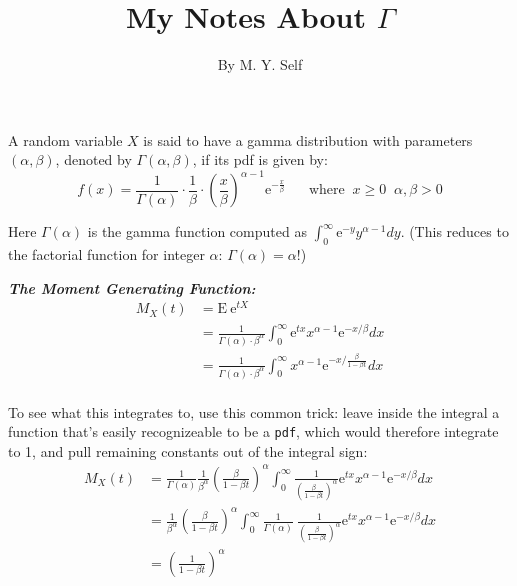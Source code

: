 \documentclass[12pt]{article}
\begin{document}
 \renewcommand{\arraystretch}{1.3}

 
\title{My Notes About $\Gamma$}%
\author{By M. Y. Self} %
 
\maketitle
 A random variable $X$ is said to have a gamma distribution with parameters $(\alpha, \beta)$, denoted by  $\Gamma(\alpha, \beta)$, if its  pdf is given by:
$$
		f(x) = \frac{1}{\Gamma({\alpha})} \cdot \frac{1}{\beta} \cdot  \left( \frac{x}{\beta}\right)^{\alpha - 1} \mathrm{e}^{-\frac{x}{\beta}} \;\;\;\;\;\; \text{where} \;\;  x \ge 0 \;\; \alpha, \beta > 0
$$

Here $\Gamma(\alpha)$ is the gamma function computed as $\int_0^{\infty} \mathrm{e}^{-y} y^{\alpha - 1} dy$. (This reduces to the factorial function for integer $\alpha$: $\Gamma(\alpha) = \alpha!$)


\bigskip

\textbf{\color{TealBlue}\emph{The Moment Generating Function:} } 
\begin{align*}
M_X(t) &= \mathrm{E} \: \mathrm{e}^{tX} \\ 
&=  \frac{1}{\Gamma(\alpha) \cdot \beta^{\alpha}} \int_0^{\infty} \mathrm{e}^{tx} x^{\alpha - 1} \mathrm{e}^{-x/\beta} dx\\
&=  \frac{1}{\Gamma(\alpha) \cdot \beta^{\alpha}} \int_0^{\infty}  x^{\alpha - 1} \mathrm{e}^{ - x/ \frac{\beta}{1 - \beta t }} dx \\
\end{align*}

To see what this integrates to, use this common trick: leave inside the integral a function that's easily recognizeable to be a \texttt{pdf}, which
would therefore integrate to 1, and pull remaining constants out of the integral sign:
\begin{align*}
M_X(t) &= \frac{1}{\Gamma(\alpha)} \frac{1}{\beta^{\alpha}}\left( \frac{\beta}{1 - \beta t} \right)^\alpha \int_0^{\infty} \frac{1} { \left( \frac{\beta}{1 - \beta t} \right)^\alpha} \mathrm{e}^{tx} x^{\alpha - 1} \mathrm{e}^{-x/\beta} dx\\
 &= \frac{1}{\beta^{\alpha}}\left( \frac{\beta}{1 - \beta t} \right)^\alpha \int_0^{\infty} \frac{1}{\Gamma(\alpha)} \: \frac{1} { \left( \frac{\beta}{1 - \beta t} \right)^\alpha} \mathrm{e}^{tx} x^{\alpha - 1} \mathrm{e}^{-x/\beta} dx\\
&= \left( \frac{1} { 1 - \beta t } \right)^{\alpha}
\end{align*}
\end{document}
